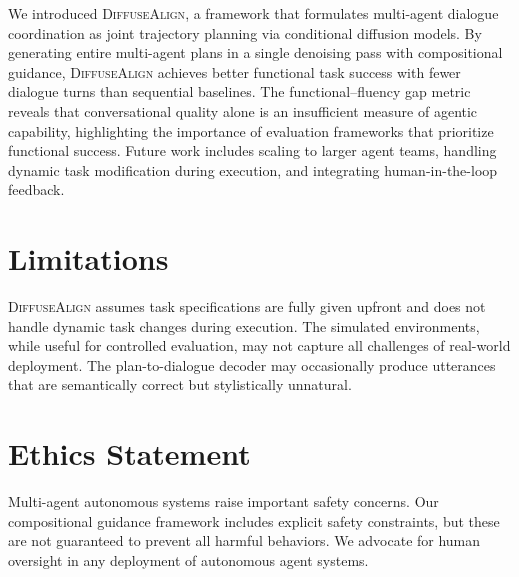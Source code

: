 \documentclass[11pt]{article}
\newcommand{\method}{\textsc{DiffuseAlign}}
\begin{document}
We introduced \method{}, a framework that formulates multi-agent dialogue coordination as joint trajectory planning via conditional diffusion models. By generating entire multi-agent plans in a single denoising pass with compositional guidance, \method{} achieves better functional task success with fewer dialogue turns than sequential baselines. The functional--fluency gap metric reveals that conversational quality alone is an insufficient measure of agentic capability, highlighting the importance of evaluation frameworks that prioritize functional success. Future work includes scaling to larger agent teams, handling dynamic task modification during execution, and integrating human-in-the-loop feedback.

\section*{Limitations}

\method{} assumes task specifications are fully given upfront and does not handle dynamic task changes during execution. The simulated environments, while useful for controlled evaluation, may not capture all challenges of real-world deployment. The plan-to-dialogue decoder may occasionally produce utterances that are semantically correct but stylistically unnatural.

\section*{Ethics Statement}

Multi-agent autonomous systems raise important safety concerns. Our compositional guidance framework includes explicit safety constraints, but these are not guaranteed to prevent all harmful behaviors. We advocate for human oversight in any deployment of autonomous agent systems.




\end{document}
